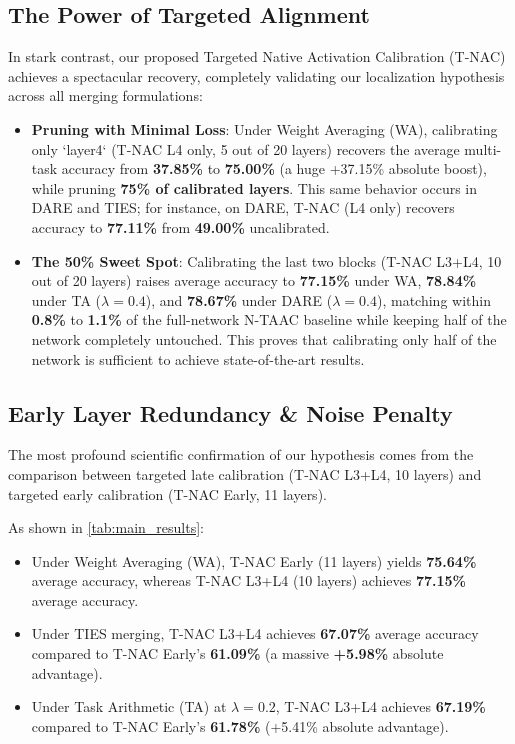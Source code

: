 \documentclass{article}
\theoremstyle{plain}
\theoremstyle{definition}
\begin{document}
\subsection{The Power of Targeted Alignment}
In stark contrast, our proposed Targeted Native Activation Calibration (T-NAC) achieves a spectacular recovery, completely validating our localization hypothesis across all merging formulations:
\begin{itemize}\setlength{\itemsep}{0pt}\setlength{\parskip}{0pt}
    \item \textbf{Pruning with Minimal Loss}: Under Weight Averaging (WA), calibrating only `layer4` (T-NAC L4 only, 5 out of 20 layers) recovers the average multi-task accuracy from \textbf{37.85\%} to \textbf{75.00\%} (a huge +37.15\% absolute boost), while pruning \textbf{75\% of calibrated layers}. This same behavior occurs in DARE and TIES; for instance, on DARE, T-NAC (L4 only) recovers accuracy to \textbf{77.11\%} from \textbf{49.00\%} uncalibrated.
    \item \textbf{The 50\% Sweet Spot}: Calibrating the last two blocks (T-NAC L3+L4, 10 out of 20 layers) raises average accuracy to \textbf{77.15\%} under WA, \textbf{78.84\%} under TA ($\lambda=0.4$), and \textbf{78.67\%} under DARE ($\lambda=0.4$), matching within \textbf{0.8\%} to \textbf{1.1\%} of the full-network N-TAAC baseline while keeping half of the network completely untouched. This proves that calibrating only half of the network is sufficient to achieve state-of-the-art results.
\end{itemize}

\subsection{Early Layer Redundancy \& Noise Penalty}
The most profound scientific confirmation of our hypothesis comes from the comparison between targeted late calibration (T-NAC L3+L4, 10 layers) and targeted early calibration (T-NAC Early, 11 layers). 

As shown in \cref{tab:main_results}:
\begin{itemize}\setlength{\itemsep}{0pt}\setlength{\parskip}{0pt}
    \item Under Weight Averaging (WA), T-NAC Early (11 layers) yields \textbf{75.64\%} average accuracy, whereas T-NAC L3+L4 (10 layers) achieves \textbf{77.15\%} average accuracy.
    \item Under TIES merging, T-NAC L3+L4 achieves \textbf{67.07\%} average accuracy compared to T-NAC Early's \textbf{61.09\%} (a massive \textbf{+5.98\%} absolute advantage).
    \item Under Task Arithmetic (TA) at $\lambda=0.2$, T-NAC L3+L4 achieves \textbf{67.19\%} compared to T-NAC Early's \textbf{61.78\%} (+5.41\% absolute advantage).
\end{itemize}
\end{document}
